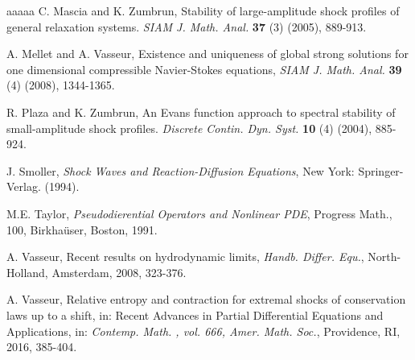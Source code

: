 \documentclass[10pt,reqno]{amsart}
\numberwithin{equation}{section}
\begin{document}
\begin{thebibliography}{aaaaa}
 C. Mascia and K. Zumbrun, Stability of large-amplitude shock profiles of general relaxation systems. {\it SIAM J. Math. Anal.} {\bf  37} (3) (2005), 889-913.

 A. Mellet and A. Vasseur, Existence and uniqueness of global strong solutions for one dimensional compressible Navier-Stokes equations, {\it SIAM J. Math. Anal.} {\bf  39} (4) (2008), 1344-1365.




 R. Plaza and K. Zumbrun,  An Evans function approach to spectral stability of small-amplitude shock profiles. {\it Discrete Contin. Dyn. Syst.} {\bf 10} (4) (2004), 885-924.




 J. Smoller, {\it Shock Waves and Reaction-Diffusion Equations},  New York: Springer-Verlag. (1994).


 M.E. Taylor, {\it Pseudodierential Operators and Nonlinear PDE}, Progress Math., 100, Birkha\"user, Boston, 1991.

 A. Vasseur, Recent results on hydrodynamic limits, {\it Handb. Differ. Equ.}, North-Holland, Amsterdam, 2008, 323-376.

 A. Vasseur, Relative entropy and contraction for extremal shocks of conservation laws up to a shift, in: Recent Advances in Partial Differential Equations and Applications, in: {\it Contemp. Math. , vol. 666, Amer. Math. Soc.}, Providence, RI, 2016, 385-404.
\end{thebibliography}
\end{document}
